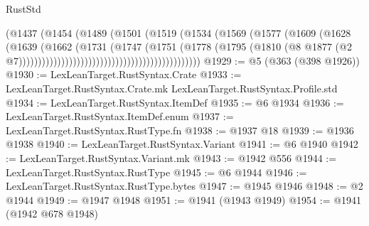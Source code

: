 \begin{lexlean}{RustStd}
\begin{coremodule}
{\begin{coremodule}
{{{{{{{{{{{{{{{{{{{{{{{{{{{{{{{{{{{{{{{{{{{{{{{{{{{{{                                                          (@1437
                                                            (@1454
                                                              (@1489
                                                                (@1501
                                                                  (@1519
                                                                    (@1534
                                                                      (@1569
                                                                        (@1577
                                                                          (@1609
                                                                            (@1628
                                                                              (@1639
                                                                                (@1662
                                                                                  (@1731
                                                                                    (@1747
                                                                                      (@1751
                                                                                        (@1778
                                                                                          (@1795
                                                                                            (@1810
                                                                                              (@8
                                                                                                @1877
                                                                                                (@2
                                                                                                  @7)))))))))))))))))))))))))))))))))))))))))))))))
@1929 := @5 (@363 (@398 @1926))
@1930 := LexLeanTarget.RustSyntax.Crate
@1933 := LexLeanTarget.RustSyntax.Crate.mk LexLeanTarget.RustSyntax.Profile.std
@1934 := LexLeanTarget.RustSyntax.ItemDef
@1935 := @6 @1934
@1936 := LexLeanTarget.RustSyntax.ItemDef.enum
@1937 := LexLeanTarget.RustSyntax.RustType.fn
@1938 := @1937 @18
@1939 := @1936 @1938
@1940 := LexLeanTarget.RustSyntax.Variant
@1941 := @6 @1940
@1942 := LexLeanTarget.RustSyntax.Variant.mk
@1943 := @1942 @556
@1944 := LexLeanTarget.RustSyntax.RustType
@1945 := @6 @1944
@1946 := LexLeanTarget.RustSyntax.RustType.bytes
@1947 := @1945 @1946
@1948 := @2 @1944
@1949 := @1947 @1948
@1951 := @1941 (@1943 @1949)
@1954 := @1941 (@1942 @678 @1948)
}}}}}}}}}}}}}}}}}}}}}}}}}}}}}}}}}}}}}}}}}}}}}}}}}}}}}
\end{coremodule}}
\end{coremodule}
\end{lexlean}
